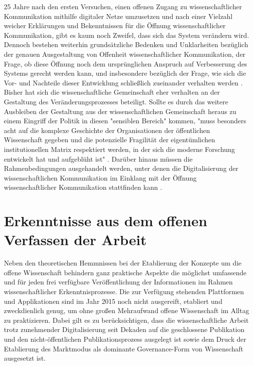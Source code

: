25 Jahre nach den ersten Versuchen, einen offenen Zugang zu wissenschaftlicher Kommunikation mithilfe digitaler Netze umzusetzen und nach einer Vielzahl weicher Erklärungen und Bekenntnissen für die Öffnung wissenschaftlicher Kommunikation, gibt es kaum noch Zweifel, dass sich das System verändern wird. Dennoch bestehen weiterhin grundsätzliche Bedenken und Unklarheiten bezüglich der genauen Ausgestaltung von Offenheit wissenschaftlicher Kommunikation, der Frage, ob diese Öffnung noch dem ursprünglichen Anspruch auf Verbesserung des Systems gerecht werden kann, und insbesondere bezüglich der Frage, wie sich die Vor- und Nachteile dieser Entwicklung schließlich zueinander verhalten werden \cite{Hagner_2015}. Bisher hat sich die wissenschaftliche Gemeinschaft eher verhalten an der Gestaltung des Veränderungsprozesses beteiligt. Sollte es durch das weitere Ausbleiben der Gestaltung aus der wissenschaftlichen Gemeinschaft heraus zu einem Eingriff der Politik in diesen "sensiblen Bereich" kommen, "muss besonders acht auf die komplexe Geschichte der Organisationen der öffentlichen Wissenschaft gegeben und die potenzielle Fragilität der eigentümlichen institutionellen Matrix respektiert werden, in der sich die moderne Forschung entwickelt hat und aufgeblüht ist" \cite{David_1998}. Darüber hinaus müssen die Rahmenbedingungen ausgehandelt werden, unter denen die Digitalisierung der wissenschaftlichen Kommunikation im Einklang mit der Öffnung wissenschaftlicher Kommunikation stattfinden kann \cite{Mennes_2013}.

\section{Erkenntnisse aus dem offenen Verfassen der Arbeit}

Neben den theoretischen Hemmnissen bei der Etablierung der Konzepte um die offene Wissenschaft behindern ganz praktische Aspekte die möglichst umfassende und für jeden frei verfügbare Veröffentlichung der Informationen im Rahmen wissenschaftlicher Erkenntnisprozesse. Die zur Verfügung stehenden Plattformen und Applikationen sind im Jahr 2015 noch nicht ausgereift, etabliert und zweckdienlich genug, um ohne großen Mehraufwand offene Wissenschaft im Alltag zu praktizieren. Dabei gilt es zu berücksichtigen, dass die wissenschaftliche Arbeit trotz zunehmender Digitalisierung seit Dekaden auf die geschlossene Publikation und den nicht-öffentlichen Publikationsprozess ausgelegt ist sowie dem Druck der Etablierung des Marktmodus als dominante Governance-Form von Wissenschaft ausgesetzt ist.

